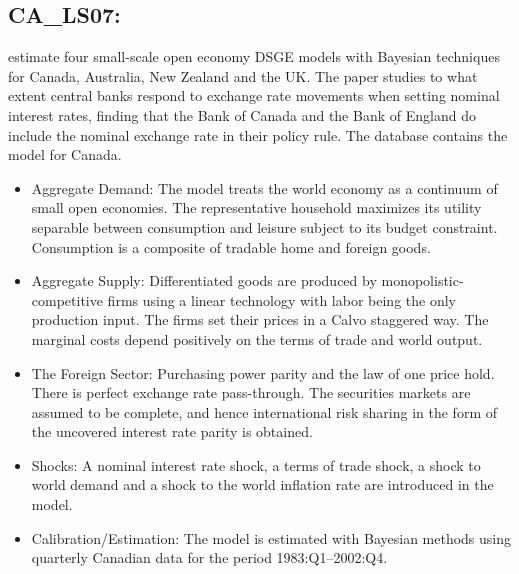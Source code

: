 \documentclass[11pt,a4paper]{article}
\begin{document}
	
	\subsection{CA\_LS07: \cite{LubikSchorfheide2007}}
	\label{CALS07}
	\cite{LubikSchorfheide2007} estimate four small-scale open economy DSGE models with Bayesian techniques for Canada, Australia, New Zealand and the UK. The paper studies to what extent central banks respond to exchange rate movements when setting nominal interest rates, finding that the Bank of Canada and the Bank of England do include the nominal exchange rate in their policy rule. The database contains the model for Canada.
	
	\begin{itemize}
		
		\item Aggregate Demand: The model treats the world economy as a continuum of small open economies. The representative household maximizes its utility separable between consumption and leisure subject to its budget constraint. Consumption is a composite of tradable home and foreign goods.
		
		\item Aggregate Supply: Differentiated goods are produced by monopolistic-competitive firms using a linear technology with labor being the only production input. The firms set their prices in a Calvo staggered way. The marginal costs depend positively on the terms of trade and world output.
		
		\item The Foreign Sector: Purchasing power parity and the law of one price hold. There is perfect exchange rate pass-through.  The securities markets are assumed to be complete, and hence international risk sharing in the form of the uncovered interest rate parity is obtained.
		
		\item Shocks: A nominal interest rate shock, a terms of trade shock, a shock to world demand and a shock to the world inflation rate are introduced in the model.
		
		\item Calibration/Estimation: The model is estimated with Bayesian methods using quarterly Canadian data for the period 1983:Q1--2002:Q4.
		
		
	\end{itemize}
	
\end{document}
